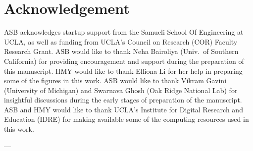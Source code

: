 \documentclass[preprint,12pt, 3p, sort&compress]{elsarticle}
\begin{document}
\section*{Acknowledgement}
ASB acknowledges startup support from the Samueli School Of Engineering at UCLA, as well as funding from UCLA's Council on Research (COR) Faculty Research Grant. ASB would like to thank Neha Bairoliya (Univ.~of Southern California) for providing encouragement and support during the preparation of this manuscript. HMY would like to thank Elliona Li for her help in preparing some of the figures in this work. ASB would like to thank Vikram Gavini (University of Michigan) and Swarnava Ghosh (Oak Ridge National Lab) for insightful discussions during the early stages of preparation of the manuscript. ASB and HMY would like to thank UCLA's Institute for Digital Research and Education (IDRE) for making available some of the computing resources used in this work.
\newpage

%
\begin{center}
---
\end{center}

\end{document}
